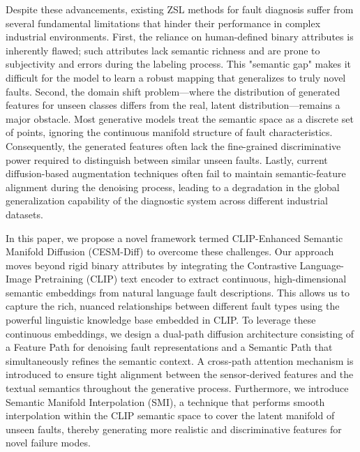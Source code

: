 Despite these advancements, existing ZSL methods for fault diagnosis suffer from several fundamental limitations that hinder their performance in complex industrial environments. First, the reliance on human-defined binary attributes is inherently flawed; such attributes lack semantic richness and are prone to subjectivity and errors during the labeling process. This "semantic gap" makes it difficult for the model to learn a robust mapping that generalizes to truly novel faults. Second, the domain shift problem—where the distribution of generated features for unseen classes differs from the real, latent distribution—remains a major obstacle. Most generative models treat the semantic space as a discrete set of points, ignoring the continuous manifold structure of fault characteristics. Consequently, the generated features often lack the fine-grained discriminative power required to distinguish between similar unseen faults. Lastly, current diffusion-based augmentation techniques often fail to maintain semantic-feature alignment during the denoising process, leading to a degradation in the global generalization capability of the diagnostic system across different industrial datasets.

In this paper, we propose a novel framework termed CLIP-Enhanced Semantic Manifold Diffusion (CESM-Diff) to overcome these challenges. Our approach moves beyond rigid binary attributes by integrating the Contrastive Language-Image Pretraining (CLIP) text encoder to extract continuous, high-dimensional semantic embeddings from natural language fault descriptions. This allows us to capture the rich, nuanced relationships between different fault types using the powerful linguistic knowledge base embedded in CLIP. To leverage these continuous embeddings, we design a dual-path diffusion architecture consisting of a Feature Path for denoising fault representations and a Semantic Path that simultaneously refines the semantic context. A cross-path attention mechanism is introduced to ensure tight alignment between the sensor-derived features and the textual semantics throughout the generative process. Furthermore, we introduce Semantic Manifold Interpolation (SMI), a technique that performs smooth interpolation within the CLIP semantic space to cover the latent manifold of unseen faults, thereby generating more realistic and discriminative features for novel failure modes.

